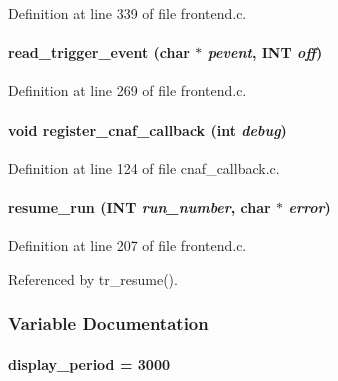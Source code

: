 Definition at line 339 of file frontend.c.
\paragraph[{read\_\-trigger\_\-event}]{ read\_\-trigger\_\-event (char $\ast$ {\em pevent}, \/  {\bf INT} {\em off})}\hfill\label{frontend_8c_a9c54bafa1af403e5e4737f9d8d5aba07}


Definition at line 269 of file frontend.c.
\paragraph[{register\_\-cnaf\_\-callback}]{\setlength{\rightskip}{0pt plus 5cm}void register\_\-cnaf\_\-callback (int {\em debug})}\hfill\label{frontend_8c_a4c2c646c3b139346601893d06cf6df9d}


Definition at line 124 of file cnaf\_\-callback.c.
\paragraph[{resume\_\-run}]{ resume\_\-run ({\bf INT} {\em run\_\-number}, \/  char $\ast$ {\em error})}\hfill\label{frontend_8c_a6cada7e3f07b9fc2b9886263223661d4}


Definition at line 207 of file frontend.c.

Referenced by tr\_\-resume().

\subsubsection{Variable Documentation}
\paragraph[{display\_\-period}]{ {\bf display\_\-period} = 3000}\hfill\label{frontend_8c_ab9cdcefda91459091b0ed33011d0d18c}


